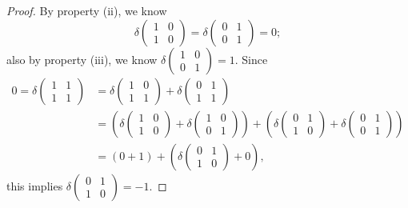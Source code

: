 \begin{Exercise}
\begin{proof}
By property (ii), we know 
$$
\delta\begin{pmatrix}
1 & 0 \\
1 & 0
\end{pmatrix} = \delta\begin{pmatrix}
0 & 1 \\
0 & 1
\end{pmatrix} = 0;
$$
also by property (iii), we know $\delta\begin{pmatrix}
1 & 0 \\
0 & 1
\end{pmatrix} = 1$. Since
\begin{align*}
0 = \delta\begin{pmatrix}
1 & 1 \\
1 & 1
\end{pmatrix} 
&= \delta\begin{pmatrix}
1 & 0 \\
1 & 1
\end{pmatrix} + \delta\begin{pmatrix}
0 & 1 \\
1 & 1
\end{pmatrix} \\
&= \left( \delta\begin{pmatrix}
1 & 0 \\
1 & 0
\end{pmatrix} + \delta\begin{pmatrix}
1 & 0 \\
0 & 1
\end{pmatrix} \right) + \left( \delta\begin{pmatrix}
0 & 1 \\
1 & 0
\end{pmatrix} + \delta\begin{pmatrix}
0 & 1 \\
0 & 1
\end{pmatrix} \right) \\
&= ( 0 + 1 ) + \left(\delta\begin{pmatrix}
0 & 1 \\
1 & 0
\end{pmatrix} + 0 \right),
\end{align*}
this implies $\delta\begin{pmatrix}
0 & 1 \\
1 & 0
\end{pmatrix} = -1$.


\end{proof}
\end{Exercise}
